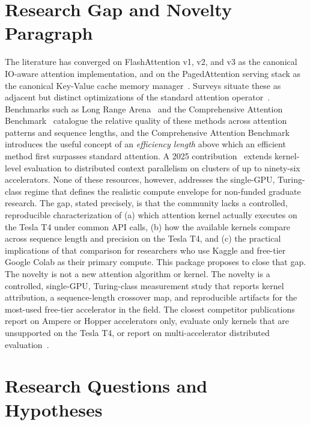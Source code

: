 \documentclass[11pt]{article}
\begin{document}
\section{Research Gap and Novelty Paragraph}

The literature has converged on FlashAttention v1, v2, and v3 as the canonical IO-aware attention implementation, and on the PagedAttention serving stack as the canonical Key-Value cache memory manager~\parencite{kwon2023efficientmemorymanagementlarge}. Surveys situate these as adjacent but distinct optimizations of the standard attention operator~\parencite{10.1145/3530811, sun2026efficientattentionmechanismslarge}. Benchmarks such as Long Range Arena~\parencite{tay2020longrangearenabenchmark} and the Comprehensive Attention Benchmark~\parencite{zhang2025cabcomprehensiveattentionbenchmarking} catalogue the relative quality of these methods across attention patterns and sequence lengths, and the Comprehensive Attention Benchmark introduces the useful concept of an \textit{efficiency length} above which an efficient method first surpasses standard attention. A 2025 contribution~\parencite{bu2025longcontextattentionbenchmark} extends kernel-level evaluation to distributed context parallelism on clusters of up to ninety-six accelerators. None of these resources, however, addresses the single-GPU, Turing-class regime that defines the realistic compute envelope for non-funded graduate research. The gap, stated precisely, is that the community lacks a controlled, reproducible characterization of (a) which attention kernel actually executes on the Tesla T4 under common API calls, (b) how the available kernels compare across sequence length and precision on the Tesla T4, and (c) the practical implications of that comparison for researchers who use Kaggle and free-tier Google Colab as their primary compute. This package proposes to close that gap. The novelty is not a new attention algorithm or kernel. The novelty is a controlled, single-GPU, Turing-class measurement study that reports kernel attribution, a sequence-length crossover map, and reproducible artifacts for the most-used free-tier accelerator in the field. The closest competitor publications report on Ampere or Hopper accelerators only, evaluate only kernels that are unsupported on the Tesla T4, or report on multi-accelerator distributed evaluation~\parencite{dao2022flashattentionfastmemoryefficientexact, dao2023flashattention2fasterattentionbetter, bu2025longcontextattentionbenchmark}.

\section{Research Questions and Hypotheses}
\end{document}
